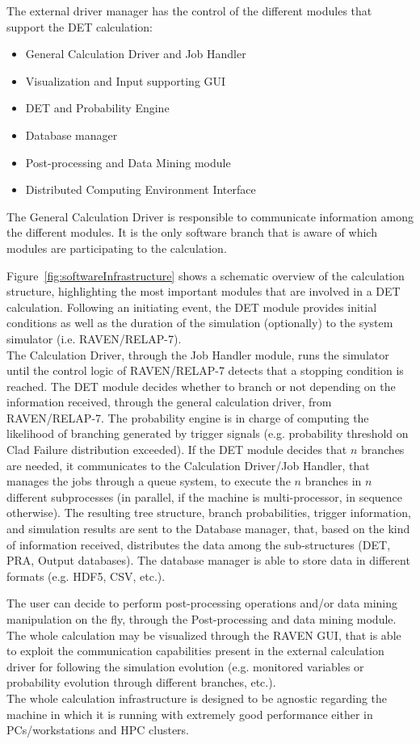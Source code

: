 The external driver manager has the control of the different modules that support the DET calculation:
\vspace{-5mm}
\begin{itemize}
\itemsep0em
\item General Calculation Driver and Job Handler
\item Visualization and Input supporting GUI
\item DET and Probability Engine
\item Database manager
\item Post-processing and Data Mining module
\item Distributed Computing Environment Interface
\end{itemize}
\vspace{-5mm}
The General Calculation Driver is responsible to communicate information among the different modules. It is the only software branch that is aware of which modules are participating to the calculation.

Figure~\ref{fig:softwareInfrastructure} shows a schematic overview of the calculation structure, highlighting the most important modules that are involved in a DET calculation. Following an initiating event, the DET module provides initial conditions as well as the duration of the simulation (optionally) to the system simulator (i.e. RAVEN/RELAP-7).
\\The Calculation Driver, through the Job Handler module, runs the simulator until the control logic of RAVEN/RELAP-7 detects that a stopping condition is reached. The DET module decides whether to branch or not depending on the information received, through the general calculation driver, from RAVEN/RELAP-7.
The probability engine is in charge of computing the likelihood of branching generated by trigger signals (e.g. probability threshold on Clad Failure distribution exceeded).  If the DET module decides that $n$ branches are needed, it communicates to the Calculation Driver/Job Handler, that manages the jobs through a queue system, to execute the $n$ branches in $n$ different subprocesses (in parallel, if the machine is multi-processor, in sequence otherwise). The resulting tree structure, branch probabilities, trigger information, and simulation results are sent to the Database manager, that, based on the kind of information received, distributes the data among the sub-structures (DET, PRA, Output databases). The database manager is able to store data in different formats (e.g. HDF5, CSV, etc.).

The user can decide to perform post-processing operations and/or data mining manipulation on the fly, through the Post-processing and data mining module. The whole calculation may be visualized through the RAVEN GUI, that is able to exploit the communication capabilities present in the external calculation driver for following the simulation evolution (e.g. monitored variables or probability evolution through different branches, etc.). \\ The whole calculation infrastructure is designed to be agnostic regarding the machine in which it is running with extremely good performance either in PCs/workstations and HPC clusters.
